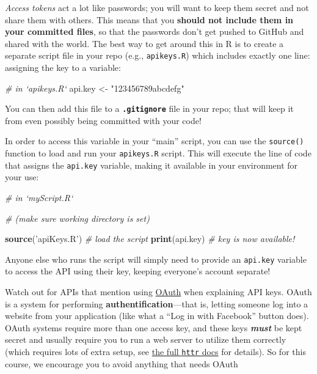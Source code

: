\documentclass[]{book}
\newenvironment{Shaded}{\begin{snugshade}}{\end{snugshade}}
\newcommand{\KeywordTok}[1]{\textcolor[rgb]{0.13,0.29,0.53}{\textbf{#1}}}
\newcommand{\StringTok}[1]{\textcolor[rgb]{0.31,0.60,0.02}{#1}}
\newcommand{\CommentTok}[1]{\textcolor[rgb]{0.56,0.35,0.01}{\textit{#1}}}
\newcommand{\NormalTok}[1]{#1}
\theoremstyle{definition}
\theoremstyle{definition}
\theoremstyle{remark}
\begin{document}
\emph{Access tokens} act a lot like passwords; you will want to keep
them secret and not share them with others. This means that you
\textbf{should not include them in your committed files}, so that the
passwords don't get pushed to GitHub and shared with the world. The best
way to get around this in R is to create a separate script file in your
repo (e.g., \texttt{apikeys.R}) which includes exactly one line:
assigning the key to a variable:

\begin{Shaded}
\begin{Highlighting}[]
\CommentTok{# in `apikeys.R`}
\NormalTok{api.key <-}\StringTok{ "123456789abcdefg"}
\end{Highlighting}
\end{Shaded}

You can then add this file to a \textbf{\texttt{.gitignore}} file in
your repo; that will keep it from even possibly being committed with
your code!

In order to access this variable in your ``main'' script, you can use
the \texttt{source()} function to load and run your \texttt{apikeys.R}
script. This will execute the line of code that assigns the
\texttt{api.key} variable, making it available in your environment for
your use:

\begin{Shaded}
\begin{Highlighting}[]
\CommentTok{# in `myScript.R`}

\CommentTok{# (make sure working directory is set)}

\KeywordTok{source}\NormalTok{(}\StringTok{'apiKeys.R'}\NormalTok{)  }\CommentTok{# load the script}
\KeywordTok{print}\NormalTok{(api.key)  }\CommentTok{# key is now available!}
\end{Highlighting}
\end{Shaded}

Anyone else who runs the script will simply need to provide an
\texttt{api.key} variable to access the API using their key, keeping
everyone's account separate!

Watch out for APIs that mention using
\href{https://en.wikipedia.org/wiki/OAuth}{OAuth} when explaining API
keys. OAuth is a system for performing \textbf{authentification}---that
is, letting someone log into a website from your application (like what
a ``Log in with Facebook'' button does). OAuth systems require more than
one access key, and these keys \textbf{\emph{must}} be kept secret and
usually require you to run a web server to utilize them correctly (which
requires lots of extra setup, see
\href{https://cran.r-project.org/web/packages/httr/httr.pdf}{the full
\texttt{httr} docs} for details). So for this course, we encourage you
to avoid anything that needs OAuth
\end{document}
